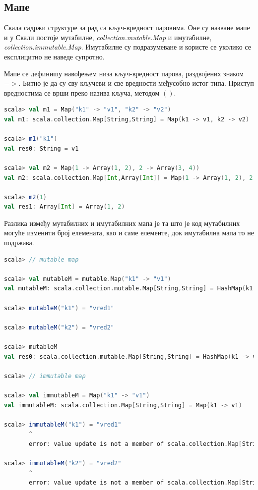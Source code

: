 \documentclass[12pt,oneside]{memoir}
\begin{document}
\subsection{Мапе}
\label{subsec:scala_maps}

Скала садржи структуре за рад са кључ-вредност паровима. Оне су назване мапе и у Скали постоје мутабилне, \textit{collection.mutable.Map} и имутабилне, \textit{collection.immutable.Map}. Имутабилне су подразумеване и користе се уколико се експлицитно не наведе супротно.

Мапе се дефинишу навођењем низа кључ-вредност парова, раздвојених знаком $->$. Битно је да су сву кључеви и све вредности међусобно истог типа. Приступ вредностима се врши преко назива кључа, методом $()$.

\begin{lstlisting}[language=Scala, caption={Мапе у Скали}, label={lst:scala_app_maps_example}]
scala> val m1 = Map("k1" -> "v1", "k2" -> "v2")
val m1: scala.collection.Map[String,String] = Map(k1 -> v1, k2 -> v2)

scala> m1("k1")
val res0: String = v1

scala> val m2 = Map(1 -> Array(1, 2), 2 -> Array(3, 4))
val m2: scala.collection.Map[Int,Array[Int]] = Map(1 -> Array(1, 2), 2 -> Array(3, 4))

scala> m2(1)
val res1: Array[Int] = Array(1, 2)
\end{lstlisting}

Разлика између мутабилних и имутабилних мапа је та што је код мутабилних могуће изменити број елемената, као и саме елементе, док имутабилна мапа то не подржава.

\begin{lstlisting}[language=Scala, caption={Измена елемента код мутабилних и имутабилних мапа}, label={lst:scala_coll_maps_mutable_immutable}]
scala> // mutable map

scala> val mutableM = mutable.Map("k1" -> "v1")
val mutableM: scala.collection.mutable.Map[String,String] = HashMap(k1 -> v1)

scala> mutableM("k1") = "vred1"

scala> mutableM("k2") = "vred2"

scala> mutableM
val res0: scala.collection.mutable.Map[String,String] = HashMap(k1 -> vred1, k2 -> vred2)

scala> // immutable map

scala> val immutableM = Map("k1" -> "v1")
val immutableM: scala.collection.Map[String,String] = Map(k1 -> v1)

scala> immutableM("k1") = "vred1"
       ^
       error: value update is not a member of scala.collection.Map[String,String]

scala> immutableM("k2") = "vred2"
       ^
       error: value update is not a member of scala.collection.Map[String,String]

\end{lstlisting}
\end{document}
